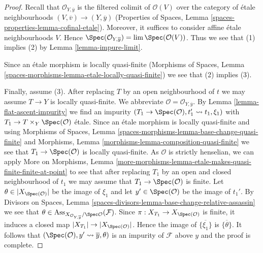 \begin{proof}
Recall that $\mathcal{O}_{Y, \overline{y}}$ is the filtered colimit
of $\mathcal{O}(V)$ over the category
of \'etale neighbourhoods $(V, \overline{v}) \to (Y, \overline{y})$
(Properties of Spaces, Lemma \ref{spaces-properties-lemma-cofinal-etale}).
Moreover, it suffices to consider affine \'etale neighbourhoods $V$.
Hence $\Spec(\mathcal{O}_{Y, \overline{y}}) = \lim \Spec(\mathcal{O}(V))$.
Thus we see that (1) implies (2) by Lemma \ref{lemma-impure-limit}.

\medskip\noindent
Since an \'etale morphism is locally quasi-finite
(Morphisms of Spaces, Lemma
\ref{spaces-morphisms-lemma-etale-locally-quasi-finite})
we see that (2) implies (3).

\medskip\noindent
Finally, assume (3). After replacing $T$ by an open neighbourhood of $t$
we may assume $T \to Y$ is locally quasi-finite. We abbreviate
$\mathcal{O} = \mathcal{O}_{Y, \overline{y}}$.
By Lemma \ref{lemma-flat-ascent-impurity}
we find an impurity
$(T_1 \to \Spec(\mathcal{O}), t_1' \leadsto t_1, \xi_1)$
with $T_1 \to T \times_Y \Spec(\mathcal{O})$
\'etale. Since an \'etale morphism is locally quasi-finite
and using Morphisms of Spaces, Lemma
\ref{spaces-morphisms-lemma-base-change-quasi-finite} and
Morphisms, Lemma \ref{morphisms-lemma-composition-quasi-finite}
we see that $T_1 \to \Spec(\mathcal{O})$
is locally quasi-finite.
As $\mathcal{O}$ is strictly henselian, we can apply More on Morphisms, Lemma
\ref{more-morphisms-lemma-etale-makes-quasi-finite-finite-at-point}
to see that after replacing $T_1$ by an open and closed neighbourhood
of $t_1$ we may assume that $T_1 \to \Spec(\mathcal{O})$
is finite. Let $\theta \in |X_{\Spec(\mathcal{O})}|$ be the image of
$\xi_1$ and let $y' \in \Spec(\mathcal{O})$ be the image
of $t_1'$. By Divisors on Spaces, Lemma
\ref{spaces-divisors-lemma-base-change-relative-assassin}
we see that $\theta \in
\text{Ass}_{X_{\mathcal{O}_{Y, \overline{y}}}/\Spec\mathcal{O}}
(\mathcal{F})$.
Since $\pi : X_{T_1} \to X_{\Spec(\mathcal{O})}$
is finite, it induces a closed map $|X_{T_1}| \to |X_{\Spec(\mathcal{O})}|$.
Hence the image of $\overline{\{\xi_1\}}$ is $\overline{\{\theta\}}$.
It follows that $(\Spec(\mathcal{O}), y' \leadsto \overline{y}, \theta)$
is an impurity of $\mathcal{F}$ above $y$ and the proof is complete.
\end{proof}















